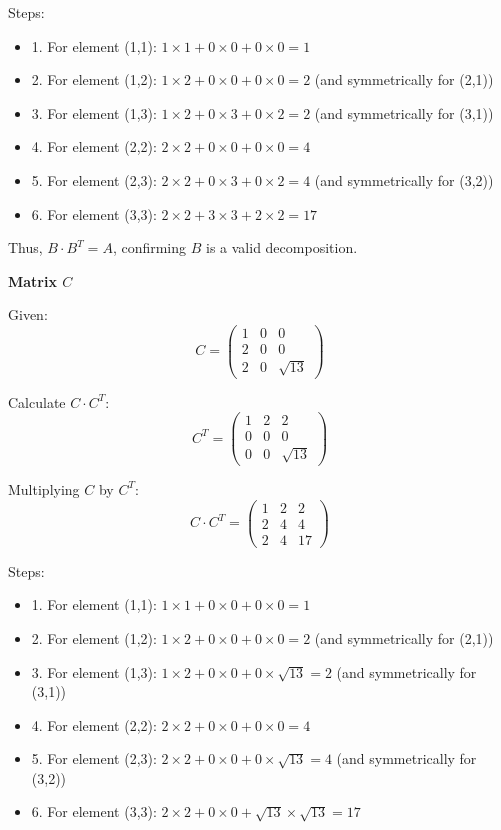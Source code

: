 \documentclass[8pt]{article}
\begin{document}
Steps:
\begin{itemize}
    \item 1. For element (1,1): \(1 \times 1 + 0 \times 0 + 0 \times 0 = 1\)
    \item 2. For element (1,2): \(1 \times 2 + 0 \times 0 + 0 \times 0 = 2\) (and symmetrically for (2,1))
    \item 3. For element (1,3): \(1 \times 2 + 0 \times 3 + 0 \times 2 = 2\) (and symmetrically for (3,1))
    \item 4. For element (2,2): \(2 \times 2 + 0 \times 0 + 0 \times 0 = 4\)
    \item 5. For element (2,3): \(2 \times 2 + 0 \times 3 + 0 \times 2 = 4\) (and symmetrically for (3,2))
    \item 6. For element (3,3): \(2 \times 2 + 3 \times 3 + 2 \times 2 = 17\)
\end{itemize}

Thus, \(B \cdot B^T = A\), confirming \(B\) is a valid decomposition.

\textbf{Matrix \(C\)}

Given:
\[ C = \begin{pmatrix} 1 & 0 & 0 \\ 2 & 0 & 0 \\ 2 & 0 & \sqrt{13} \end{pmatrix} \]

Calculate \(C \cdot C^T\):
\[ C^T = \begin{pmatrix} 1 & 2 & 2 \\ 0 & 0 & 0 \\ 0 & 0 & \sqrt{13} \end{pmatrix} \]

Multiplying \(C\) by \(C^T\):
\[ C \cdot C^T = \begin{pmatrix} 1 & 2 & 2 \\ 2 & 4 & 4 \\ 2 & 4 & 17 \end{pmatrix} \]

Steps:
\begin{itemize}
    \item 1. For element (1,1): \(1 \times 1 + 0 \times 0 + 0 \times 0 = 1\)
    \item 2. For element (1,2): \(1 \times 2 + 0 \times 0 + 0 \times 0 = 2\) (and symmetrically for (2,1))
    \item 3. For element (1,3): \(1 \times 2 + 0 \times 0 + 0 \times \sqrt{13} = 2\) (and symmetrically for (3,1))
    \item 4. For element (2,2): \(2 \times 2 + 0 \times 0 + 0 \times 0 = 4\)
    \item 5. For element (2,3): \(2 \times 2 + 0 \times 0 + 0 \times \sqrt{13} = 4\) (and symmetrically for (3,2))
    \item 6. For element (3,3): \(2 \times 2 + 0 \times 0 + \sqrt{13} \times \sqrt{13} = 17\)
\end{itemize}
\end{document}
